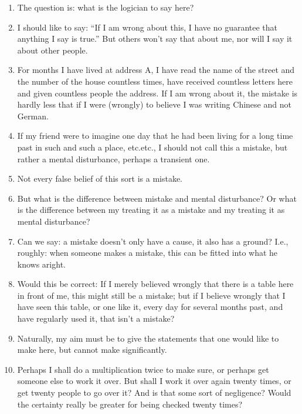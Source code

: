 \documentclass{book}
\begin{document}
\begin{enumerate}
\item
The question is: what is the logician to say here?

\item
I should like to say: ``If I am wrong about this, I have no guarantee that
anything I say is true.'' But others won't say that about me, nor will I say it
about other people.

\item
For months I have lived at address A, I have read the name of the street and
the number of the house countless times, have received countless letters here
and given countless people the address. If I am wrong about it, the mistake is
hardly less that if I were (wrongly) to believe I was writing Chinese and not
German.

\item
If my friend were to imagine one day that he had been living for a long time
past in such and such a place, etc.etc., I should not call this a mistake, but
rather a mental disturbance, perhaps a transient one.

\item
Not every false belief of this sort is a mistake.

\item
But what is the difference between mistake and mental disturbance? Or what is
the difference between my treating it as a mistake and my treating it as mental
disturbance?

\item
Can we say: a mistake doesn't only have a cause, it also has a ground? I.e.,
roughly: when someone makes a mistake, this can be fitted into what he knows
aright.

\item
Would this be correct: If I merely believed wrongly that there is a table here
in front of me, this might still be a mistake; but if I believe wrongly that I
have seen this table, or one like it, every day for several months past, and
have regularly used it, that isn't a mistake?

\item
Naturally, my aim must be to give the statements that one would like to make
here, but cannot make significantly.

\item
Perhaps I shall do a multiplication twice to make sure, or perhaps get someone
else to work it over. But shall I work it over again twenty times, or get
twenty people to go over it? And is that some sort of negligence? Would the
certainty really be greater for being checked twenty times?


\end{enumerate}
\end{document}
